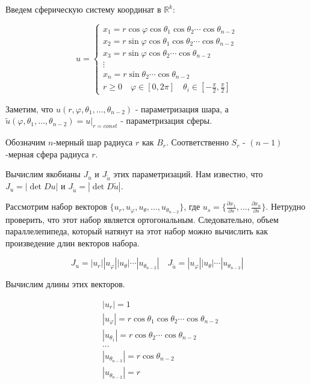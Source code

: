 \documentclass[a5paper]{article}
\theoremstyle{plain}
\theoremstyle{definition}
\numberwithin{through}{section}
\numberwithin{equation}{section}
\begin{document}
Введем сферическую систему координат в $\mathbb{R}^k$:

\begin{equation*}
	u = 
	\begin{cases}
		x_1 = r \cos \varphi \cos \theta_1 \cos \theta_2 \cdots \cos \theta_{n-2} \\
		x_2  = r \sin \varphi \cos \theta_1 \cos \theta_2 \cdots \cos \theta_{n-2} \\
		x_3 = r \sin \varphi \cos \theta_2 \cdots \cos \theta_{n-2} \\
		\vdots \\
		x_n = r \sin \theta_2 \cdots \cos \theta_{n-2} \\
		
		r \geq 0 \quad \varphi \in [0, 2\pi] \quad \theta_i \in [-\frac{\pi}{2}, \frac{\pi}{2}]
	\end{cases}
\end{equation*}

Заметим, что $u(r, \varphi, \theta_1, \ldots, \theta_{n-2})$ - параметризация шара, а $\tilde{u}(\varphi, \theta_1, \ldots, \theta_{n-2})=u|_{r=const}$ - параметризация сферы.

Обозначим $n$-мерный шар радиуса $r$ как $B_r$. Соответственно $S_r$ - $(n-1)$-мерная сфера радиуса $r$.

Вычислим якобианы $J_u$ и $J_{\tilde{u}}$ этих параметризаций. Нам известно, что $J_u = |\det Du|$ и $J_{\tilde{u}} = |\det D \tilde{u}|$. 

Рассмотрим набор векторов $\{u_r, u_{\varphi}, u_{\theta}, \ldots, u_{\theta_{n-2}} \}$, где $u_s=\{ \frac{\partial x_1}{\partial s}, \ldots, \frac{\partial x_n}{\partial s} \}$. Нетрудно проверить, что этот набор является ортогональным. Следовательно, объем параллелепипеда, который натянут на этот набор можно вычислить как произведение длин векторов набора.

\begin{equation*}
	J_u =|u_r||u_{\varphi}||u_{\theta}|\cdots|u_{\theta_{n-2}}| \quad
		J_{\tilde{u}} =|u_{\varphi}||u_{\theta}|\cdots|u_{\theta_{n-2}}|
\end{equation*}

Вычислим длины этих векторов.

\begin{align*}
	& |u_r| =  1 \\
	& |u_{\varphi}| = r \cos \theta_1 \cos \theta_2 \cdots \cos \theta_{n-2} \\
	& |u_{\theta_1}| = r \cos \theta_2 \cdots \cos \theta_{n-2} \\
 & 	\ldots\\
	& |u_{\theta_{n-3}}|  = r \cos \theta_{n-2} \\
	& |u_{\theta_{n-2}}| = r
\end{align*}
\end{document}
